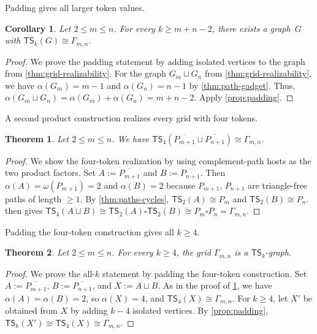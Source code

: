 \documentclass[a4paper]{article}
\theoremstyle{plain}
\newtheorem{theorem}{Theorem}[section]
\newtheorem{corollary}[corollary]{Corollary}
\theoremstyle{definition}
\newcommand{\TSsym}{\mathsf{TS}}
\numberwithin{equation}{section}
\begin{document}
Padding gives all larger token values.

\begin{corollary}
\label{cor:grid-allk}
Let $2\le m\le n$.
For every $k\ge m+n-2$, there exists a graph~$G$ with $\TSsym_k(G)\cong \Gamma_{m,n}$.
\end{corollary}

\begin{proof}
We prove the padding statement by adding isolated vertices to the graph from \cref{thm:grid-realizability}.
For the graph $G_m\sqcup G_n$ from \cref{thm:grid-realizability}, we have $\alpha(G_m)=m-1$ and $\alpha(G_n)=n-1$ by \cref{thm:path-gadget}.
Thus, $\alpha(G_m\sqcup G_n)=\alpha(G_m)+\alpha(G_n)=m+n-2$.
Apply \cref{prop:padding}.
\end{proof}

A second product construction realizes every grid with four tokens.

\begin{theorem}
\label{thm:grid-four-token-product}
Let $2\le m\le n$.
We have $\TSsym_4(\overline{P_{m+1}}\sqcup\overline{P_{n+1}})\cong\Gamma_{m,n}$.
\end{theorem}

\begin{proof}
We show the four-token realization by using complement-path hosts as the two product factors.
Set $A:=\overline{P_{m+1}}$ and $B:=\overline{P_{n+1}}$.
Then $\alpha(A)=\omega(P_{m+1})=2$ and $\alpha(B)=2$ because $P_{m+1}$, $P_{n+1}$ are triangle-free paths of length $\ge 1$.
By \cref{thm:paths-cycles}, $\TSsym_2(A)\cong P_m$ and $\TSsym_2(B)\cong P_n$.
 then gives $\TSsym_4(A\sqcup B)\cong \TSsym_2(A)\square \TSsym_2(B)\cong P_m\square P_n=\Gamma_{m,n}$.
\end{proof}

Padding the four-token construction gives all $k\ge 4$.

\begin{theorem}
\label{thm:grid-allk-four}
Let $2\le m\le n$.
For every $k\ge 4$, the grid $\Gamma_{m,n}$ is a $\TSsym_k$-graph.
\end{theorem}

\begin{proof}
We prove the all-$k$ statement by padding the four-token construction.
Set $A:=\overline{P_{m+1}}$, $B:=\overline{P_{n+1}}$, and $X:=A\sqcup B$.
As in the proof of \cref{thm:grid-four-token-product}, we have $\alpha(A)=\alpha(B)=2$, so $\alpha(X)=4$, and $\TSsym_4(X)\cong\Gamma_{m,n}$.
For $k\ge 4$, let $X'$ be obtained from $X$ by adding $k-4$ isolated vertices.
By \cref{prop:padding}, $\TSsym_k(X')\cong\TSsym_4(X)\cong\Gamma_{m,n}$.
\end{proof}
\end{document}
